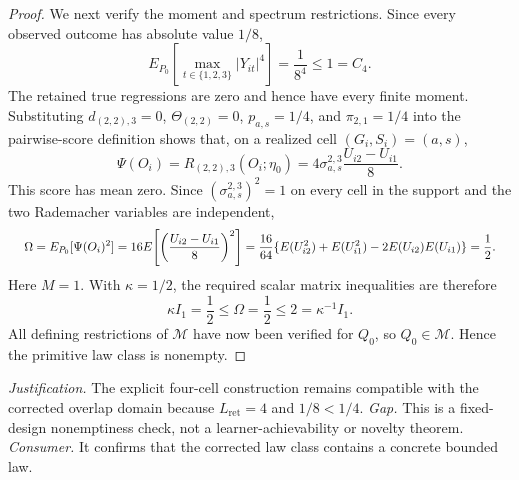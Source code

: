 \documentclass{article}
\begin{document}
\begin{proof}
We next verify the moment and spectrum restrictions. Since every observed outcome has absolute value \(1/8\),
\[
E_{P_0}\!\left[\max_{t\in\{1,2,3\}}|Y_{it}|^4\right]
=\frac1{8^4}
\le 1=C_4.
\]
The retained true regressions are zero and hence have every finite moment. Substituting \(d_{(2,2),3}=0\), \(\Theta_{(2,2)}=0\), \(p_{a,s}=1/4\), and \(\pi_{2,1}=1/4\) into the pairwise-score definition shows that, on a realized cell \((G_i,S_i)=(a,s)\),
\[
\Psi(O_i)
=R_{(2,2),3}(O_i;\eta_0)
=4\sigma_{a,s}^{2,3}\frac{U_{i2}-U_{i1}}8.
\]
This score has mean zero. Since \((\sigma_{a,s}^{2,3})^2=1\) on every cell in the support and the two Rademacher variables are independent,
\[
\makebox[\linewidth][c]{\resizebox{0.98\linewidth}{!}{\(\displaystyle \Omega
=E_{P_0}[\Psi(O_i)^2]
=16E\!\left[\left(\frac{U_{i2}-U_{i1}}8\right)^2\right]
=\frac{16}{64}\{E(U_{i2}^2)+E(U_{i1}^2)-2E(U_{i2})E(U_{i1})\}
=\frac12.\)}}
\]
Here \(M=1\). With \(\kappa=1/2\), the required scalar matrix inequalities are therefore
\[
\kappa I_1=\frac12\le\Omega=\frac12\le 2=\kappa^{-1}I_1.
\]
All defining restrictions of \(\mathcal M\) have now been verified for \(Q_0\), so \(Q_0\in\mathcal M\). Hence the primitive law class is nonempty.
\end{proof}
\par\smallskip\noindent \textit{Justification.} The explicit four-cell construction remains compatible with the corrected overlap domain because \(L_{\mathrm{ret}}=4\) and \(1/8<1/4\). \textit{Gap.} This is a fixed-design nonemptiness check, not a learner-achievability or novelty theorem. \textit{Consumer.} It confirms that the corrected law class contains a concrete bounded law.
\end{document}
